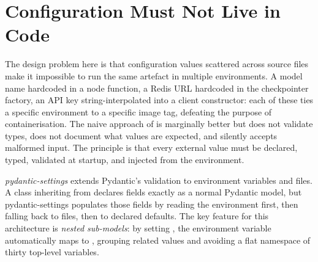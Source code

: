 \section{Configuration Must Not Live in Code}
\label{sec:config-must-not-live}

The design problem here is that configuration values scattered across source
files make it impossible to run the same artefact in multiple environments.
A model name hardcoded in a node function, a Redis URL hardcoded in the
checkpointer factory, an API key string-interpolated into a client
constructor: each of these ties a specific environment to a specific image
tag, defeating the purpose of containerisation. The naive approach of
 is marginally better but does not
validate types, does not document what values are expected, and silently
accepts malformed input. The principle is that every external value must be
declared, typed, validated at startup, and injected from the environment.

\emph{pydantic-settings} extends Pydantic's validation to environment
variables and  files. A class inheriting from 
declares fields exactly as a normal Pydantic model, but pydantic-settings
populates those fields by reading the environment first, then falling back to
 files, then to declared defaults. The key feature for this
architecture is \emph{nested sub-models}: by setting
, the environment variable
 automatically maps to
, grouping related values and avoiding
a flat namespace of thirty top-level variables.

